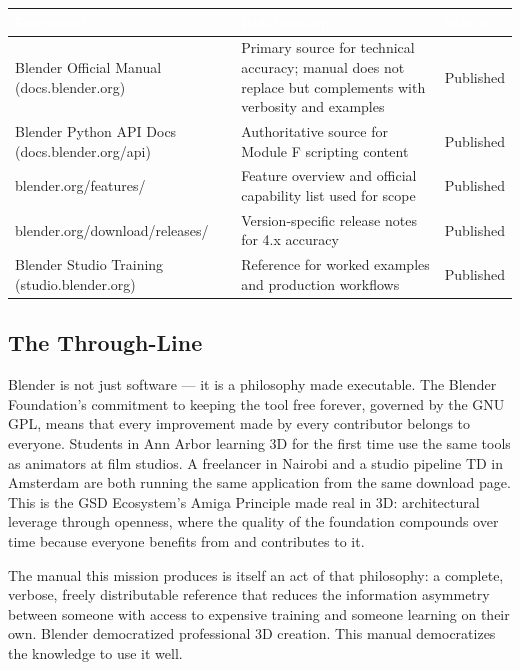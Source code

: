 \documentclass[11pt,letterpaper]{article}
\newcommand{\tableheader}[1]{\textbf{\sffamily\textcolor{white}{#1}}}
\begin{document}
\begin{center}
\begin{tabularx}{\textwidth}{L{4cm}XC{2.5cm}}
\toprule
{}
\tableheader{Document} & \tableheader{Relationship} & \tableheader{Status} \\
\midrule
Blender Official Manual (docs.blender.org) & Primary source for technical accuracy; manual does not replace but complements with verbosity and examples & Published \\
Blender Python API Docs (docs.blender.org/api) & Authoritative source for Module F scripting content & Published \\
blender.org/features/ & Feature overview and official capability list used for scope & Published \\
blender.org/download/releases/ & Version-specific release notes for 4.x accuracy & Published \\
Blender Studio Training (studio.blender.org) & Reference for worked examples and production workflows & Published \\
\bottomrule
\end{tabularx}
\end{center}

\subsection{The Through-Line}

Blender is not just software --- it is a philosophy made executable. The Blender Foundation's commitment to keeping the tool free forever, governed by the GNU GPL, means that every improvement made by every contributor belongs to everyone. Students in Ann Arbor learning 3D for the first time use the same tools as animators at film studios. A freelancer in Nairobi and a studio pipeline TD in Amsterdam are both running the same application from the same download page. This is the GSD Ecosystem's Amiga Principle made real in 3D: architectural leverage through openness, where the quality of the foundation compounds over time because everyone benefits from and contributes to it.

The manual this mission produces is itself an act of that philosophy: a complete, verbose, freely distributable reference that reduces the information asymmetry between someone with access to expensive training and someone learning on their own. Blender democratized professional 3D creation. This manual democratizes the knowledge to use it well.
\end{document}
